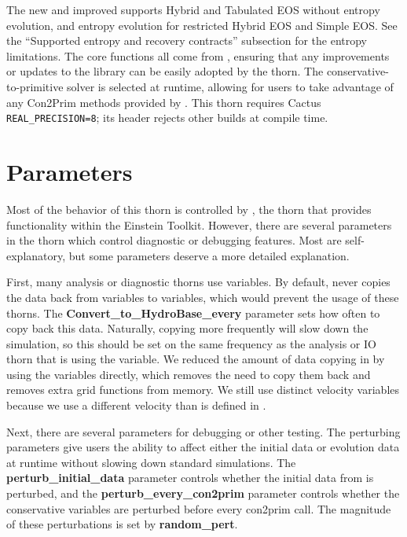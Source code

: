 \documentclass{article}
\begin{document}
The new and improved \igm{} supports Hybrid and Tabulated EOS without
entropy evolution, and entropy evolution for restricted Hybrid EOS and
Simple EOS. See the ``Supported entropy and recovery contracts'' subsection
for the entropy limitations. The core functions
all come from \glib, ensuring that any improvements or updates
to the library can be easily adopted by the thorn. The
conservative-to-primitive solver is selected at runtime, allowing
for users to take advantage of any Con2Prim methods provided by \grhayl.
This thorn requires Cactus \texttt{REAL\_PRECISION=8}; its header rejects
other builds at compile time.

\section{Parameters}

Most of the behavior of this thorn is controlled by \glib,
the thorn that provides \grhayl{} functionality
within the Einstein Toolkit. However, there are several
parameters in the thorn which control diagnostic or debugging
features. Most are self-explanatory, but some parameters deserve
a more detailed explanation.

First, many analysis or diagnostic thorns use \hydrobase{} variables.
By default, \igm{} never copies the data back from \igm{} variables
to \hydrobase{} variables, which would prevent the usage of these
thorns. The \textbf{Convert\_to\_HydroBase\_every} parameter
sets how often to copy back this data. Naturally, copying more
frequently will slow down the simulation, so this should be set
on the same frequency as the analysis or IO thorn that is using
the \hydrobase{} variable. We reduced the amount of data copying in \igm{}
by using the \hydrobase{} variables directly, which removes the need
to copy them back and removes extra grid functions from memory.
We still use distinct velocity variables because we use a different
velocity than is defined in \hydrobase.

Next, there are several parameters for debugging or other testing.
The perturbing parameters give users the ability to affect either
the initial data or evolution data at runtime without slowing down
standard simulations. The \textbf{perturb\_initial\_data} parameter
controls whether the initial data from \hydrobase{} is perturbed, and
the \textbf{perturb\_every\_con2prim} parameter controls whether
the conservative variables are perturbed before every con2prim call.
The magnitude of these perturbations is set by \textbf{random\_pert}.
\end{document}
